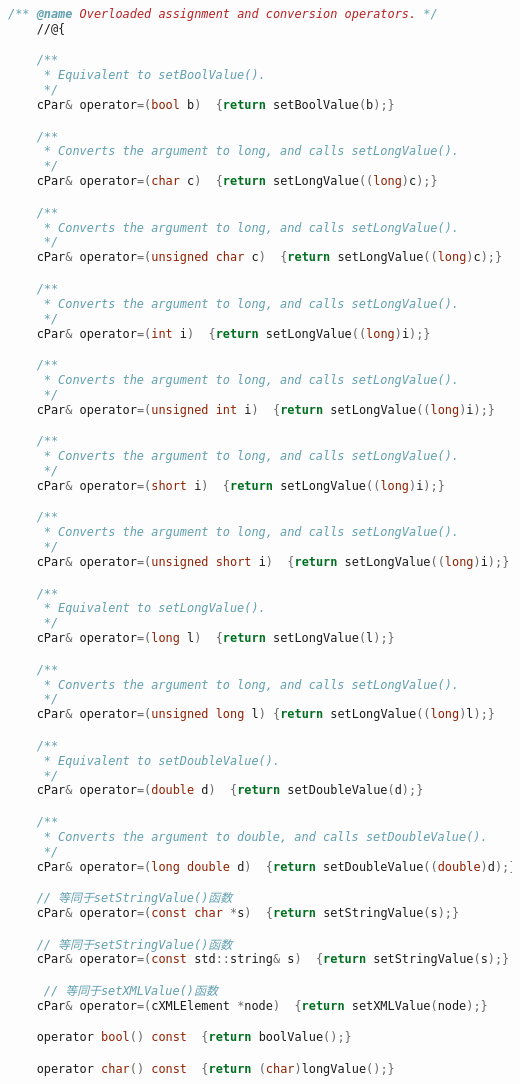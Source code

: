 \begin{lstlisting}[language=c]
    /** @name Overloaded assignment and conversion operators. */
    //@{

    /**
     * Equivalent to setBoolValue().
     */
    cPar& operator=(bool b)  {return setBoolValue(b);}

    /**
     * Converts the argument to long, and calls setLongValue().
     */
    cPar& operator=(char c)  {return setLongValue((long)c);}

    /**
     * Converts the argument to long, and calls setLongValue().
     */
    cPar& operator=(unsigned char c)  {return setLongValue((long)c);}

    /**
     * Converts the argument to long, and calls setLongValue().
     */
    cPar& operator=(int i)  {return setLongValue((long)i);}

    /**
     * Converts the argument to long, and calls setLongValue().
     */
    cPar& operator=(unsigned int i)  {return setLongValue((long)i);}

    /**
     * Converts the argument to long, and calls setLongValue().
     */
    cPar& operator=(short i)  {return setLongValue((long)i);}

    /**
     * Converts the argument to long, and calls setLongValue().
     */
    cPar& operator=(unsigned short i)  {return setLongValue((long)i);}

    /**
     * Equivalent to setLongValue().
     */
    cPar& operator=(long l)  {return setLongValue(l);}

    /**
     * Converts the argument to long, and calls setLongValue().
     */
    cPar& operator=(unsigned long l) {return setLongValue((long)l);}

    /**
     * Equivalent to setDoubleValue().
     */
    cPar& operator=(double d)  {return setDoubleValue(d);}

    /**
     * Converts the argument to double, and calls setDoubleValue().
     */
    cPar& operator=(long double d)  {return setDoubleValue((double)d);}

    // 等同于setStringValue()函数
    cPar& operator=(const char *s)  {return setStringValue(s);}

    // 等同于setStringValue()函数
    cPar& operator=(const std::string& s)  {return setStringValue(s);}

     // 等同于setXMLValue()函数
    cPar& operator=(cXMLElement *node)  {return setXMLValue(node);}

    operator bool() const  {return boolValue();}

    operator char() const  {return (char)longValue();}


\end{lstlisting}
